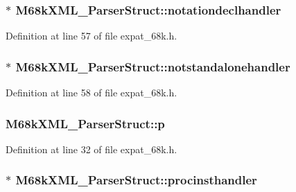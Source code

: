 \subsubsection[{\texorpdfstring{notationdeclhandler}{notationdeclhandler}}]{$\ast$ M68k\+X\+M\+L\+\_\+\+Parser\+Struct\+::notationdeclhandler}\hypertarget{struct_m68k_x_m_l___parser_struct_ada359e87de51a16877f2bb604b27e36f}{}\label{struct_m68k_x_m_l___parser_struct_ada359e87de51a16877f2bb604b27e36f}


Definition at line 57 of file expat\+\_\+68k.\+h.

\subsubsection[{\texorpdfstring{notstandalonehandler}{notstandalonehandler}}]{$\ast$ M68k\+X\+M\+L\+\_\+\+Parser\+Struct\+::notstandalonehandler}\hypertarget{struct_m68k_x_m_l___parser_struct_adace0166af3051b8ebd883d95d31dc26}{}\label{struct_m68k_x_m_l___parser_struct_adace0166af3051b8ebd883d95d31dc26}


Definition at line 58 of file expat\+\_\+68k.\+h.

\subsubsection[{\texorpdfstring{p}{p}}]{ M68k\+X\+M\+L\+\_\+\+Parser\+Struct\+::p}\hypertarget{struct_m68k_x_m_l___parser_struct_aeb6edc51a1dba19c54dd3477b8b1051b}{}\label{struct_m68k_x_m_l___parser_struct_aeb6edc51a1dba19c54dd3477b8b1051b}


Definition at line 32 of file expat\+\_\+68k.\+h.

\subsubsection[{\texorpdfstring{procinsthandler}{procinsthandler}}]{$\ast$ M68k\+X\+M\+L\+\_\+\+Parser\+Struct\+::procinsthandler}\hypertarget{struct_m68k_x_m_l___parser_struct_aa2784c873f2064a133bc1961061418af}{}\label{struct_m68k_x_m_l___parser_struct_aa2784c873f2064a133bc1961061418af}


